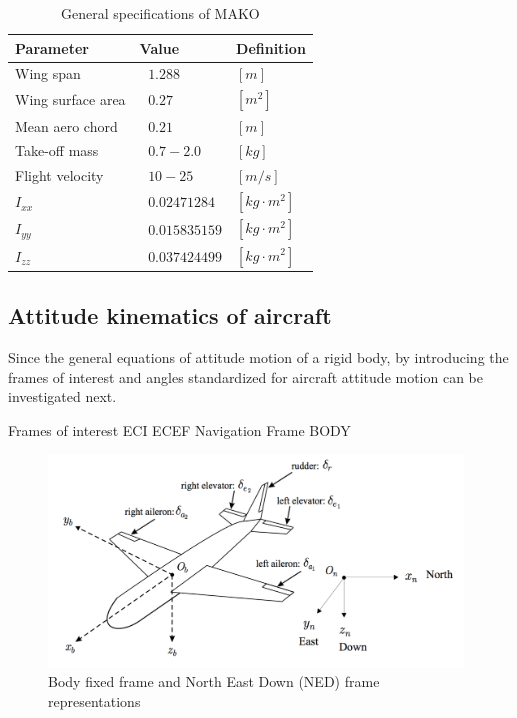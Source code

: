  \begin{table}[!htbp]
\caption{General specifications of MAKO \cite{bronz2016aerodynamic}}
\label{arm:MAKO}
\begin{center}
\begin{tabular}{ ||p{4cm}|p{3cm}|p{2cm}||}\hline
\textbf{Parameter} & \textbf{Value} & \textbf{Definition} \\\hline
Wing span                  & $\ \ \, 1.288 $	   & $[m]$ \\\hline
Wing surface area       & $ \ \ \, 0.27 $           &  $[m^2]$ \\\hline
Mean aero chord           & $\ \ \, 0.21$           & $[m]$ \\\hline
Take-off mass              & $\ \ \, 0.7 - 2.0$       & $[kg]$ \\\hline
Flight velocity              & $\ \ \, 10 - 25$       & $[m/s]$ \\\hline
$I_{xx}$                         & $\ \ \, 0.02471284$   & $[kg \cdot m^2]$ \\\hline
$I_{yy}$                         & $\ \ \, 0.015835159$   & $[kg \cdot m^2]$ \\\hline
$I_{zz}$                         & $\ \ \, 0.037424499$   & $[kg \cdot m^2]$ \\\hline
\end{tabular}
\end{center}
\end{table}


\subsection{Attitude kinematics of aircraft}

Since the general equations of attitude motion of a rigid body, by introducing the frames of interest and angles standardized for aircraft attitude motion can be investigated next. 

Frames of interest
	ECI
	ECEF
	Navigation Frame 
	BODY

\begin{figure}
\begin{center}
\includegraphics[width=11cm]{figures/bodyNEDframes}    %
\caption{Body fixed frame and North East Down (NED) frame representations \cite{ducard2009fault}} 
\label{fig:bodyNEDframes}
\end{center}
\end{figure}


